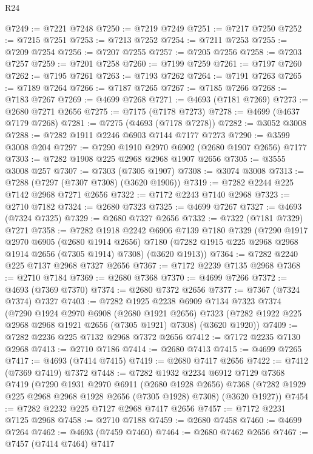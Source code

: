 \begin{lexlean}{R24}
\begin{coremodule}
@7249 := @7221 @7248
@7250 := @7219 @7249
@7251 := @7217 @7250
@7252 := @7215 @7251
@7253 := @7213 @7252
@7254 := @7211 @7253
@7255 := @7209 @7254
@7256 := @7207 @7255
@7257 := @7205 @7256
@7258 := @7203 @7257
@7259 := @7201 @7258
@7260 := @7199 @7259
@7261 := @7197 @7260
@7262 := @7195 @7261
@7263 := @7193 @7262
@7264 := @7191 @7263
@7265 := @7189 @7264
@7266 := @7187 @7265
@7267 := @7185 @7266
@7268 := @7183 @7267
@7269 := @4699 @7268
@7271 := @4693 (@7181 @7269)
@7273 := @2680 @7271 @2656
@7275 := @7175 (@7178 @7273)
@7278 := @4699 (@4637 @7179 @7268)
@7281 := @7275 (@4693 (@7178 @7278))
@7282 := @3052 @3008
@7288 := @7282 @1911 @2246 @6903 @7144 @7177 @7273
@7290 := @3599 @3008 @204
@7297 := @7290 @1910 @2970 @6902 (@2680 @1907 @2656) @7177
@7303 := @7282 @1908 @225 @2968 @2968 @1907 @2656
@7305 := @3555 @3008 @257
@7307 := @7303 (@7305 @1907)
@7308 := @3074 @3008
@7313 := @7288 (@7297 (@7307 @7308) (@3620 @1906))
@7319 := @7282 @2244 @225 @7142 @2968 @7271 @2656
@7322 := @7172 @2243 @7140 @2968
@7323 := @2710 @7182
@7324 := @2680 @7323
@7325 := @4699 @7267
@7327 := @4693 (@7324 @7325)
@7329 := @2680 @7327 @2656
@7332 := @7322 (@7181 @7329) @7271
@7358 := @7282
    @1918
    @2242
    @6906
    @7139
    @7180
    @7329
    (@7290
      @1917
      @2970
      @6905
      (@2680 @1914 @2656)
      @7180
      (@7282 @1915 @225 @2968 @2968 @1914 @2656 (@7305 @1914) @7308)
      (@3620 @1913))
@7364 := @7282 @2240 @225 @7137 @2968 @7327 @2656
@7367 := @7172 @2239 @7135 @2968
@7368 := @2710 @7184
@7369 := @2680 @7368
@7370 := @4699 @7266
@7372 := @4693 (@7369 @7370)
@7374 := @2680 @7372 @2656
@7377 := @7367 (@7324 @7374) @7327
@7403 := @7282
    @1925
    @2238
    @6909
    @7134
    @7323
    @7374
    (@7290
      @1924
      @2970
      @6908
      (@2680 @1921 @2656)
      @7323
      (@7282 @1922 @225 @2968 @2968 @1921 @2656 (@7305 @1921) @7308)
      (@3620 @1920))
@7409 := @7282 @2236 @225 @7132 @2968 @7372 @2656
@7412 := @7172 @2235 @7130 @2968
@7413 := @2710 @7186
@7414 := @2680 @7413
@7415 := @4699 @7265
@7417 := @4693 (@7414 @7415)
@7419 := @2680 @7417 @2656
@7422 := @7412 (@7369 @7419) @7372
@7448 := @7282
    @1932
    @2234
    @6912
    @7129
    @7368
    @7419
    (@7290
      @1931
      @2970
      @6911
      (@2680 @1928 @2656)
      @7368
      (@7282 @1929 @225 @2968 @2968 @1928 @2656 (@7305 @1928) @7308)
      (@3620 @1927))
@7454 := @7282 @2232 @225 @7127 @2968 @7417 @2656
@7457 := @7172 @2231 @7125 @2968
@7458 := @2710 @7188
@7459 := @2680 @7458
@7460 := @4699 @7264
@7462 := @4693 (@7459 @7460)
@7464 := @2680 @7462 @2656
@7467 := @7457 (@7414 @7464) @7417

\end{coremodule}
\end{lexlean}
